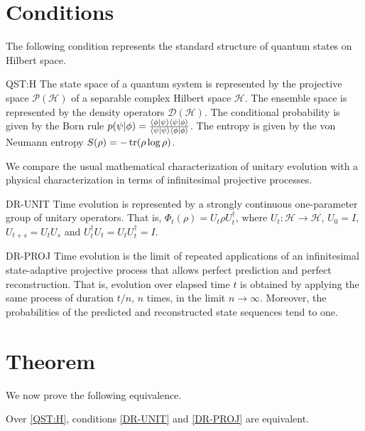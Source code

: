\documentclass{techbrief}
\begin{document}
\section{Conditions}

The following condition represents the standard structure of quantum states on Hilbert space.
\begin{condition}{QST:H}
	The state space of a quantum system is represented by the projective space $\mathcal{P}(\mathcal{H})$ of a separable complex Hilbert space $\mathcal{H}$. The ensemble space is represented by the density operators $\mathcal{D}(\mathcal{H})$. The conditional probability is given by the Born rule $p(\psi|\phi) = \frac{\langle \phi | \psi \rangle\langle \psi | \phi \rangle}{\langle \psi | \psi \rangle\langle \phi | \phi \rangle}$. The entropy is given by the von Neumann entropy $S(\rho) = -\operatorname{tr}(\rho \log \rho)$.
\end{condition}

We compare the usual mathematical characterization of unitary evolution with a physical characterization in terms of infinitesimal projective processes.
\begin{condition}{DR-UNIT}
	Time evolution is represented by a strongly continuous one-parameter group of unitary operators. That is, $\Phi_t(\rho)=U_t\rho U_t^\dagger$, where $U_t:\mathcal{H}\to\mathcal{H}$, $U_0=I$, $U_{t+s}=U_tU_s$ and $U_t^\dagger U_t=U_tU_t^\dagger=I$.
\end{condition}

\begin{condition}{DR-PROJ}
	Time evolution is the limit of repeated applications of an infinitesimal state-adaptive projective process that allows perfect prediction and perfect reconstruction. That is, evolution over elapsed time $t$ is obtained by applying the same process of duration $t/n$, $n$ times, in the limit $n\to\infty$. Moreover, the probabilities of the predicted and reconstructed state sequences tend to one.
\end{condition}

\section{Theorem}

We now prove the following equivalence.

\begin{thrm}
	Over \ref{QST:H}, conditions \ref{DR-UNIT} and \ref{DR-PROJ} are equivalent.
\end{thrm}
\end{document}
